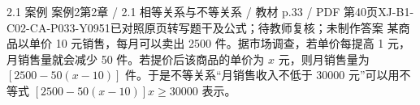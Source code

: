 \par\noindent\begin{minipage}{\linewidth}
\begin{bankitem}{2.1 案例 案例2}{第2章 / 2.1 相等关系与不等关系 / 教材 p.33 / PDF 第40页}{XJ-B1-C02-CA-P033-Y0951}{已对照原页转写题干及公式；待教师复核；未制作答案}
某商品以单价 10 元销售，每月可以卖出 2500 件。据市场调查，若单价每提高 1 元，月销售量就会减少 50 件。若提价后该商品的单价为 $x$ 元，则月销售量为 $[2500-50(x-10)]$ 件。于是不等关系“月销售收入不低于 30000 元”可以用不等式 $[2500-50(x-10)]x\ge30000$ 表示。
\end{bankitem}
\end{minipage}\par\medskip
